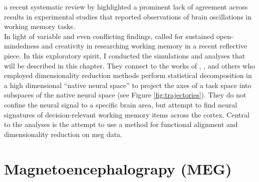 a recent systematic review by \citet{pavlov2022oscillatory} highlighted a prominent lack of agreement across results in experimental studies that reported observations of brain oscillations in working memory tasks.\\
In light of variable and even conflicting findings, \citet{nobre2022opening} called for sustained open-mindedness and creativity in researching working memory in a recent reflective piece.
In this exploratory spirit, I conducted the simulations and analyses that will be described in this chapter.
They connect to the works of \citet{murray2017stable}, \citet{machens2010functional}, \citet{rigotti2013importance} and others who employed dimensionality reduction methods perform statistical decomposition in a high dimensional ``native neural space'' to
project the axes of a task space into subspaces of the native neural space (see Figure \ref{fig:trajectories}).
They do not confine the neural signal to a specific brain area, but attempt to find neural signatures of decision-relevant working memory items across the cortex.
Central to the analyses is the attempt to use a method for functional alignment and dimensionality reduction on \gls{meg} data.









\section{Magnetoencephalograpy (MEG)}

